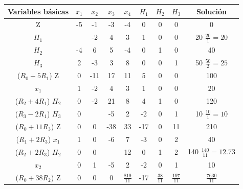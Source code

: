 \documentclass[fleqn, 12pt]{article}
\begin{document}
\begin{enumerate}
		\begin{center}
			\begin{tabular}{|c|c|c|c|c|c|c|c|c|}
				\hline
				Variables básicas & $ x_1 $ & $ x_2 $ & $ x_3 $ & $ x_4 $ & $ H_1 $ & $ H_2 $ & $ H_3 $ & Solución \\
				\hline
				Z                 & -5       & -1      & -3      & -4      & 0       & 0       & 0       & 0 \\
				\hline
				$ H_1 $           & \fbox{1} & -2      & 4       & 3       & 1       & 0       & 0       & 20 \; $ \frac{20}{1} = 20 $ \\
				\hline
				$ H_2 $           & -4       & 6       & 5       & -4      & 0       & 1       & 0       & 40 \\
				\hline
				$ H_3 $           & 2        & -3      & 3       & 8       & 0       & 0       & 1       & 50 \; $ \frac{50}{2} = 25 $ \\
				\hline\hline
				($R_0 + 5 R_1$) Z       & 0        & -11      & 17      & 11      & 5       & 0       & 0       & 100 \\
				\hline
				$ x_1 $                 & 1        & -2       & 4       & 3       & 1       & 0       & 0       & 20 \\
				\hline
				($R_2 + 4 R_1$) $ H_2 $ & 0        & -2       & 21      & 8       & 4       & 1       & 0       & 120 \\
				\hline
				($R_3 - 2 R_1$) $ H_3 $ & 0        & \fbox{1} & -5      & 2       & -2      & 0       & 1       & 10 \; $ \frac{10}{1} = 10 $ \\
				\hline\hline
				($R_0 + 11 R_3$) Z      & 0        & 0        & -38       & 33      & -17     & 0       & 11      & 210 \\
				\hline
				($R_1 + 2 R_3$) $ x_1 $ & 1        & 0        & -6        & 7       & -3      & 0       & 2       & 40 \\
				\hline
				($R_2 + 2 R_3$) $ H_2 $ & 0        & 0        & \fbox{11} & 12      & 0       & 1       & 2       & 140 \; $ \frac{140}{11} = 12.73 $ \\
				\hline
				$ x_2 $                 & 0        & 1        & -5        & 2       & -2      & 0       & 1       & 10 \\
				\hline\hline
				($R_0 + 38 R_2$) Z & 0        & 0        & 0         & $ \frac{819}{11} $ & \cellcolor{yellow} -17     & $\frac{38}{11}$ & $\frac{197}{11}$ & $\frac{7630}{11}$ \\

\end{tabular}
\end{center}
\end{enumerate}
\end{document}
